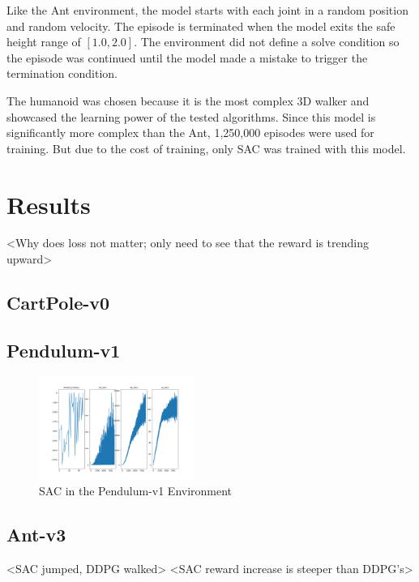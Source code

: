\documentclass[conference]{IEEEtran}
\begin{document}
Like the Ant environment, the model starts with each joint in a random position and random velocity. The episode is terminated when the model exits the safe height range of $[1.0, 2.0]$. The environment did not define a solve condition so the episode was continued until the model made a mistake to trigger the termination condition.

The humanoid was chosen because it is the most complex 3D walker and showcased the learning power of the tested algorithms. Since this model is significantly more complex than the Ant, 1,250,000 episodes were used for training. But due to the cost of training, only SAC was trained with this model.

\section{Results}

<Why does loss not matter; only need to see that the reward is trending upward>

\blindtext

\subsection{CartPole-v0}

\blindtext

\subsection{Pendulum-v1}

\begin{figure}
    \includegraphics[width=0.45\textwidth]{sac-pendulum}
    \caption{SAC in the Pendulum-v1 Environment}
\end{figure}

\blindtext

\subsection{Ant-v3}

<SAC jumped, DDPG walked>
<SAC reward increase is steeper than DDPG's>
\end{document}
